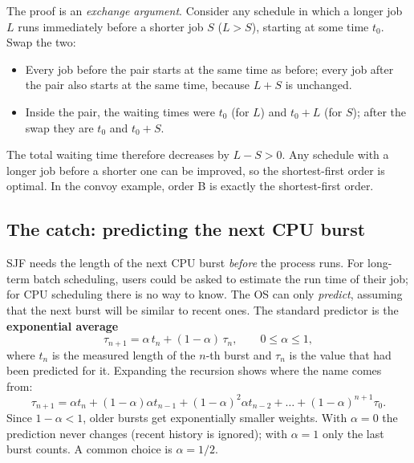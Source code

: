 \documentclass[11pt,a4paper]{article}
\newcommand{\term}[1]{\textbf{\color{mintdeep}#1}}
\begin{document}
The proof is an \emph{exchange argument}. Consider any schedule in which a longer job $L$ runs immediately before a shorter job $S$ ($L > S$), starting at some time $t_0$. Swap the two:
\begin{itemize}
  \item Every job before the pair starts at the same time as before; every job after the pair also starts at the same time, because $L+S$ is unchanged.
  \item Inside the pair, the waiting times were $t_0$ (for $L$) and $t_0+L$ (for $S$); after the swap they are $t_0$ and $t_0+S$.
\end{itemize}
The total waiting time therefore decreases by $L-S>0$. Any schedule with a longer job before a shorter one can be improved, so the shortest-first order is optimal. In the convoy example, order B is exactly the shortest-first order.

\subsection{The catch: predicting the next CPU burst}

SJF needs the length of the next CPU burst \emph{before} the process runs. For long-term batch scheduling, users could be asked to estimate the run time of their job; for CPU scheduling there is no way to know. The OS can only \emph{predict}, assuming that the next burst will be similar to recent ones. The standard predictor is the \term{exponential average}
\[
\tau_{n+1} = \alpha\, t_n + (1-\alpha)\, \tau_n, \qquad 0 \le \alpha \le 1,
\]
where $t_n$ is the measured length of the $n$-th burst and $\tau_n$ is the value that had been predicted for it. Expanding the recursion shows where the name comes from:
\[
\tau_{n+1} = \alpha t_n + (1-\alpha)\alpha t_{n-1} + (1-\alpha)^2 \alpha t_{n-2} + \dots + (1-\alpha)^{n+1}\tau_0 .
\]
Since $1-\alpha<1$, older bursts get exponentially smaller weights. With $\alpha=0$ the prediction never changes (recent history is ignored); with $\alpha=1$ only the last burst counts. A common choice is $\alpha = 1/2$.
\end{document}
